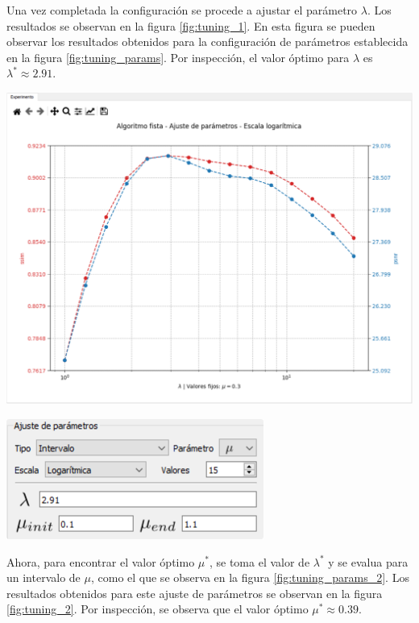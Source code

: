 \documentclass[12pt,twoside,letter]{ol-softwaremanual}
\newenvironment{Figure}
  {\par\medskip\noindent\minipage{\linewidth}}
  {\endminipage\par\medskip}
\begin{document}
Una vez completada la configuración se procede a ajustar el parámetro $\lambda$. Los resultados se observan en la figura \ref{fig:tuning_1}. En esta figura se pueden observar los resultados obtenidos para la configuración de parámetros establecida en la figura \ref{fig:tuning_params}. Por inspección, el valor óptimo para $\lambda$ es $\lambda^* \approx 2.91$.

\begin{Figure}
    \centering
    \includegraphics[width=1\linewidth]{tuning-1.png}
    \label{fig:tuning_1}
\end{Figure}

\begin{multicols}{2}
	
\begin{Figure}
	\centering
	\includegraphics[width=0.8\linewidth]{tuning-params-2.png}
	\label{fig:tuning_params_2}
\end{Figure}

Ahora, para encontrar el valor óptimo $\mu^*$, se toma el valor de $\lambda^*$ y se evalua para un intervalo de $\mu$, como el que se observa en la figura \ref{fig:tuning_params_2}. Los resultados obtenidos para este ajuste de parámetros se observan en la figura \ref{fig:tuning_2}. Por inspección, se observa que el valor óptimo $\mu^* \approx 0.39$.

\end{multicols}
\end{document}
